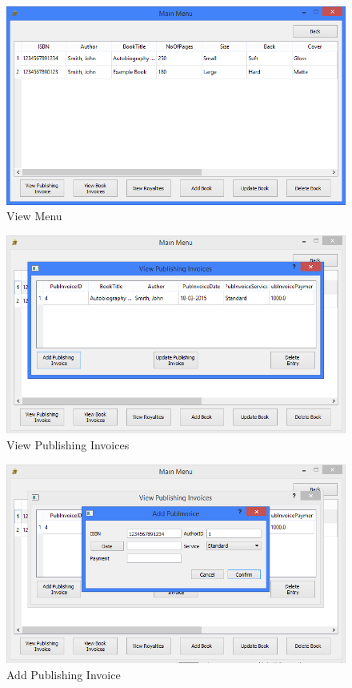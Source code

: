 \begin{figure}[H]
    \caption{View Menu} \label{fig:ViewMenu}
    \includegraphics[width=\textwidth]{./Maintenance/UserInterface/ViewMenu.png}
\end{figure}

\begin{figure}[H]
    \caption{View Publishing Invoices} \label{fig:ViewPubInvoices}
    \includegraphics[width=\textwidth]{./Maintenance/UserInterface/ViewPubInvoices.png}
\end{figure}

\begin{figure}[H]
    \caption{Add Publishing Invoice} \label{fig:AddPubInvoice}
    \includegraphics[width=\textwidth]{./Maintenance/UserInterface/AddPubInvoice.png}
\end{figure}

